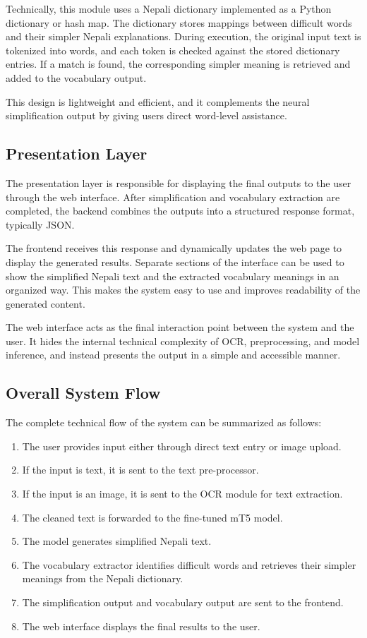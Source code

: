 \documentclass[12pt]{report}
\begin{document}
Technically, this module uses a Nepali dictionary implemented as a Python dictionary or hash map. The dictionary stores mappings between difficult words and their simpler Nepali explanations. During execution, the original input text is tokenized into words, and each token is checked against the stored dictionary entries. If a match is found, the corresponding simpler meaning is retrieved and added to the vocabulary output.

This design is lightweight and efficient, and it complements the neural simplification output by giving users direct word-level assistance.

\subsection{Presentation Layer}

The presentation layer is responsible for displaying the final outputs to the user through the web interface. After simplification and vocabulary extraction are completed, the backend combines the outputs into a structured response format, typically JSON.

The frontend receives this response and dynamically updates the web page to display the generated results. Separate sections of the interface can be used to show the simplified Nepali text and the extracted vocabulary meanings in an organized way. This makes the system easy to use and improves readability of the generated content.

The web interface acts as the final interaction point between the system and the user. It hides the internal technical complexity of OCR, preprocessing, and model inference, and instead presents the output in a simple and accessible manner.

\subsection{Overall System Flow}

The complete technical flow of the system can be summarized as follows:

\begin{enumerate}
    \item The user provides input either through direct text entry or image upload.
    \item If the input is text, it is sent to the text pre-processor.
    \item If the input is an image, it is sent to the OCR module for text extraction.
    \item The cleaned text is forwarded to the fine-tuned mT5 model.
    \item The model generates simplified Nepali text.
    \item The vocabulary extractor identifies difficult words and retrieves their simpler meanings from the Nepali dictionary.
    \item The simplification output and vocabulary output are sent to the frontend.
    \item The web interface displays the final results to the user.
\end{enumerate}
\end{document}
